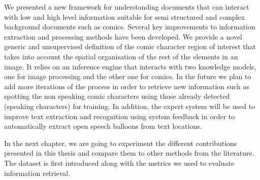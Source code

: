 We presented a new framework for understanding documents that can interact with low and high level information suitable for semi structured and complex background documents such as comics.
Several key improvements to information extraction and processing methods have been developed. 
We provide a novel generic and unsupervised definition of the comic character region of interest that takes into account the spatial organisation of the rest of the elements in an image.
It relies on an inference engine that interacts with two knowledge models, one for image processing and the other one for comics.
In the future we plan to add more iterations of the process in order to retrieve new information such as spotting the non speaking comic characters using those already detected (speaking characters) for training.
In addition, the expert system will be used to improve text extraction and recognition using system feedback in order to automatically extract open speech balloons from text locations. 

In the next chapter, we are going to experiment the different contributions presented in this thesis and compare them to other methods from the literature.
The dataset is first introduced along with the metrics we used to evaluate information retrieval. 


